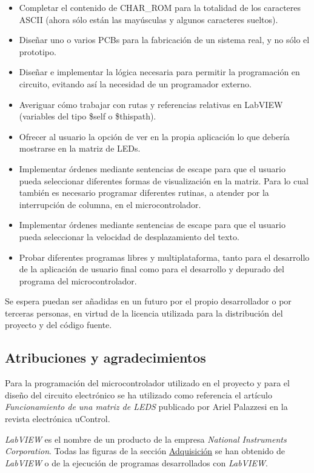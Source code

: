 \begin{itemize}
  \item{Completar el contenido de CHAR\_ROM para la totalidad de los caracteres ASCII (ahora sólo están las mayúsculas y algunos caracteres sueltos).}
  \item{Diseñar uno o varios PCBs para la fabricación de un sistema real, y no sólo el prototipo.}
  \item{Diseñar e implementar la lógica necesaria para permitir la programación en circuito, evitando así la necesidad de un programador externo.}
  \item{Averiguar cómo trabajar con rutas y referencias relativas en LabVIEW (variables del tipo \$self o \$thispath).}
  \item{Ofrecer al usuario la opción de ver en la propia aplicación lo que debería mostrarse en la matriz de LEDs.}
  \item{Implementar órdenes mediante sentencias de escape para que el usuario pueda seleccionar diferentes formas de visualización en la matriz. Para lo cual también es necesario programar diferentes rutinas, a atender por la interrupción de columna, en el microcontrolador.}
  \item{Implementar órdenes mediante sentencias de escape para que el usuario pueda seleccionar la velocidad de desplazamiento del texto.}
  \item{Probar diferentes programas libres y multiplataforma, tanto para el desarrollo de la aplicación de usuario final como para el desarrollo y depurado del programa del microcontrolador.}
\end{itemize}
  
Se espera puedan ser añadidas en un futuro por el propio desarrollador o por terceras personas, en virtud de la licencia utilizada para la distribución del proyecto y del código fuente.

\subsection{Atribuciones y agradecimientos}

Para la programación del microcontrolador utilizado en el proyecto y para el diseño del circuito electrónico se ha utilizado como referencia el artículo \textit{Funcionamiento de una matriz de LEDS}\cite{ucontrol_leds} publicado por Ariel Palazzesi en la revista electrónica uControl.

\textit{LabVIEW}\cite{labview} es el nombre de un producto de la empresa \textit{National Instruments Corporation}\cite{ni}. Todas las figuras de la sección \hyperref[sec:adquisicion]{Adquisición} se han obtenido de \textit{LabVIEW} o de la ejecución de programas desarrollados con \textit{LabVIEW}.

